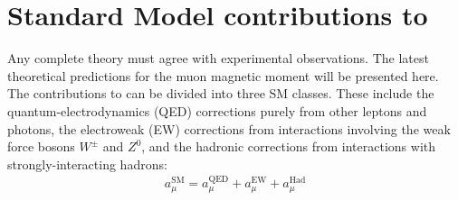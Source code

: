 \section{Standard Model contributions to \amu}
\label{sec:Theory}

Any complete theory must agree with experimental observations. The latest theoretical predictions for the muon magnetic moment will be presented here. The contributions to \amu can be divided into three SM classes. These include the quantum-electrodynamics (QED) corrections purely from other leptons and photons, the electroweak (EW) corrections from interactions involving the weak force bosons $W^{\pm}$ and $Z^{0}$, and the hadronic corrections from interactions with strongly-interacting hadrons: 
		\begin{align}
            a_{\mu}^{\text{SM}} = a_{\mu}^{\text{QED}} + a_{\mu}^{\text{EW}} + a_{\mu}^{\text{Had}}
		\end{align}


